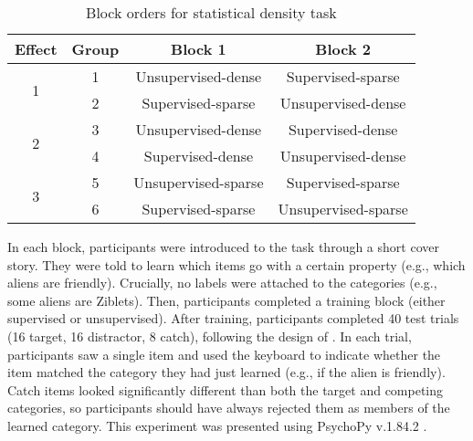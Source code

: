 \documentclass[../dissertation.tex]{subfiles}
\begin{document}
	\begin{wraptable}[11]{r}{0.6\linewidth}
\caption{Block orders for statistical density task}
\begin{center}
\begin{tabular}{ c|c|c|c } 
 \hline 
 Effect & Group & Block 1 & Block 2 \\ 
 \hline
 \multirow{2}{*}{1} & 1 & Unsupervised-dense & Supervised-sparse \\ 
 & 2 & Supervised-sparse & Unsupervised-dense \\ 
 \hline
  \multirow{2}{*}{2} & 3 & Unsupervised-dense & Supervised-dense \\ 
 & 4 & Supervised-dense & Unsupervised-dense \\
 \hline 
  \multirow{2}{*}{3} & 5 & Unsupervised-sparse & Supervised-sparse \\ 
 & 6 & Supervised-sparse & Unsupervised-sparse \\ 
 \hline
\end{tabular}
\end{center}
\vspace{-20pt}
\label{exp1order}
\end{wraptable} \par
 In each block, participants were introduced to the task through a short cover story. They were told to learn which items go with a certain property (e.g., which aliens are friendly). Crucially, no labels were attached to the categories (e.g., some aliens are Ziblets). Then, participants completed a training block (either supervised or unsupervised). After training, participants completed 40 test trials (16 target, 16 distractor, 8 catch), following the design of \citet{Kloos2008} . In each trial, participants saw a single item and used the keyboard to indicate whether the item matched the category they had just learned (e.g., if the alien is friendly). Catch items looked significantly different than both the target and competing categories, so participants should have always rejected them as members of the learned category. This experiment was presented using PsychoPy v.1.84.2 \citep{Peirce2007}. \par
\end{document}
